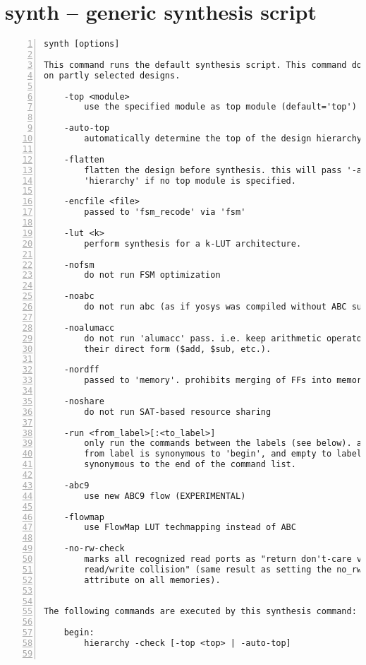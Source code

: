 \section{synth -- generic synthesis script}
\label{cmd:synth}
\begin{lstlisting}[numbers=left,frame=single]
    synth [options]

This command runs the default synthesis script. This command does not operate
on partly selected designs.

    -top <module>
        use the specified module as top module (default='top')

    -auto-top
        automatically determine the top of the design hierarchy

    -flatten
        flatten the design before synthesis. this will pass '-auto-top' to
        'hierarchy' if no top module is specified.

    -encfile <file>
        passed to 'fsm_recode' via 'fsm'

    -lut <k>
        perform synthesis for a k-LUT architecture.

    -nofsm
        do not run FSM optimization

    -noabc
        do not run abc (as if yosys was compiled without ABC support)

    -noalumacc
        do not run 'alumacc' pass. i.e. keep arithmetic operators in
        their direct form ($add, $sub, etc.).

    -nordff
        passed to 'memory'. prohibits merging of FFs into memory read ports

    -noshare
        do not run SAT-based resource sharing

    -run <from_label>[:<to_label>]
        only run the commands between the labels (see below). an empty
        from label is synonymous to 'begin', and empty to label is
        synonymous to the end of the command list.

    -abc9
        use new ABC9 flow (EXPERIMENTAL)

    -flowmap
        use FlowMap LUT techmapping instead of ABC

    -no-rw-check
        marks all recognized read ports as "return don't-care value on
        read/write collision" (same result as setting the no_rw_check
        attribute on all memories).


The following commands are executed by this synthesis command:

    begin:
        hierarchy -check [-top <top> | -auto-top]


\end{lstlisting}
